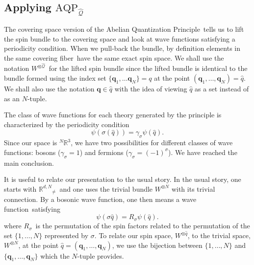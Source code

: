 \documentclass[11pt]{article}
\theoremstyle{remark}
\begin{document}
 


\subsection{Applying \ensuremath{\text{AQP}_{\ensuremath{\widehat{\ensuremath{\mathcal{Q}}}}}}}

The covering space version of the Abelian Quantization Principle\ 
tells us to lift the spin bundle to the covering
space and look at wave functions satisfying a periodicity condition. 
When we pull-back the bundle, by definition
elements in the same covering fiber\ 
have the same exact spin space. We shall  use the notation \ensuremath{\ensuremath{W}^{\otimes \ensuremath{\widehat{\ensuremath{\mathcal{Q}}}}}}\ for
 the lifted spin 
bundle since  the lifted bundle is identical to
 the bundle formed using the index set
 $\{\ensuremath{\boldsymbol{q}}_1, \dotsc \ensuremath{\boldsymbol{q}}_N\} = \ensuremath{q}$ at 
 the point $(\ensuremath{\boldsymbol{q}}_1, \dotsc, \ensuremath{\boldsymbol{q}}_N)= \ensuremath{\hat{q}}$. We shall also use the
 notation $\ensuremath{\boldsymbol{q}} \in \ensuremath{\hat{q}}$ with the idea of viewing $\ensuremath{\hat{q}}$ as a set
 instead of as an $N$-tuple. 

The class of wave functions for each theory generated by the principle 
 is characterized by the periodicity condition 
\begin{equation*}
\ensuremath{\psi} (\ensuremath{\sigma}(\ensuremath{\hat{q}}))
= \ensuremath{\gamma_{\ensuremath{\sigma}}} \ensuremath{\psi}(\ensuremath{\hat{q}}).
\end{equation*} 
 Since
 our space is \ensuremath{{}^N\ensuremath{\mathbb{R}^{\ensuremath{3}}}}, we have two 
 possibilities for different 
 classes  of wave functions: bosons  ($\ensuremath{\gamma_{\ensuremath{\sigma}}} = 1$)  and fermions ($\ensuremath{\gamma_{\ensuremath{\sigma}}}
 =(-1)^{\ensuremath{\sigma}}$).  We have reached the main
 conclusion.  


It is useful to relate our presentation to the usual story. 
In the usual story, one starts with
 \ensuremath{\ensuremath{\mathbb{R}^{d,N}}_{\neq}}\ and one  uses the trivial bundle $W^{\otimes N}$ with its trivial
connection. By a bosonic wave function, one then means a wave function\ satisfying
\begin{equation} 
\ensuremath{\psi}(\ensuremath{\sigma} \ensuremath{\hat{q}}) = \ensuremath{R_{{\ensuremath{\sigma}}}} \ensuremath{\psi}(\ensuremath{\hat{q}}).
\end{equation}
where \ensuremath{R_{{\ensuremath{\sigma}}}}\ is the permutation of the spin factors related to the
permutation of the set $\{ 1, \ldots, N \}$ represented by
$\ensuremath{\sigma}$.
To
relate our spin space, $\ensuremath{{\ensuremath{W}}^{{\otimes}{\ensuremath{\hat{q}}}}}$, to the trivial space,
$\ensuremath{{\ensuremath{W}}^{{\otimes}{N}}}$, at the point $\ensuremath{\hat{q}} = (\ensuremath{\boldsymbol{q}}_1, \dotsc, \ensuremath{\boldsymbol{q}}_N)$, we use
the bijection between $\{1, \dotsc, N\}$ and $\{\ensuremath{\boldsymbol{q}}_1, \dotsc,
\ensuremath{\boldsymbol{q}}_N\}$ which the $N$-tuple provides. 
\end{document}
